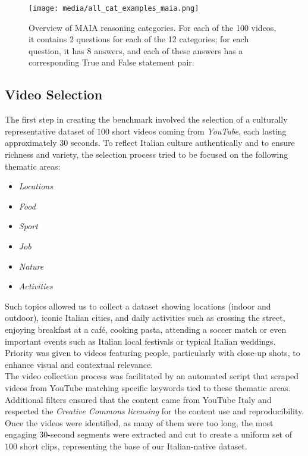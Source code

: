\begin{figure*}[ht!]
    \centering
    \texttt{[image: media/all\_cat\_examples\_maia.png]}
    \caption{Overview of  MAIA reasoning categories. For each of the 100 videos, it contains 2 questions for each of the 12 categories; for each question, it has 8 answers, and each of these answers has a corresponding True and False statement pair.}
    \label{fig:example_overview_app}
\end{figure*}



\subsection{Video Selection}
The first step in creating the benchmark involved the selection of a culturally representative dataset of $100$ short videos coming from \textit{YouTube}, each lasting approximately $30$ seconds. To reflect Italian culture authentically and to ensure richness and variety, the selection process tried to be focused on the following thematic areas:

\begin{itemize}
    \item \emph{Locations}
    \item \emph{Food}
    \item \emph{Sport}
    \item \emph{Job}
    \item \emph{Nature}
    \item \emph{Activities}
\end{itemize}

Such topics allowed us to collect a dataset showing locations (indoor and outdoor), iconic Italian cities, and daily activities such as crossing the street, enjoying breakfast at a café, cooking pasta, attending a soccer match or even important events such as Italian local festivals or typical Italian weddings. Priority was given to videos featuring people, particularly with close-up shots, to enhance visual and contextual relevance.\\
The video collection process was facilitated by an automated script that scraped videos from YouTube  matching specific keywords tied to these thematic areas. Additional filters ensured that the content came from YouTube Italy and respected the \textit{Creative Commons licensing} for the content use and reproducibility. Once the videos were identified, as many of them were too long, the most engaging $30$-second segments were extracted and cut to create a uniform set of $100$ short clips, representing the base of our Italian-native dataset.

